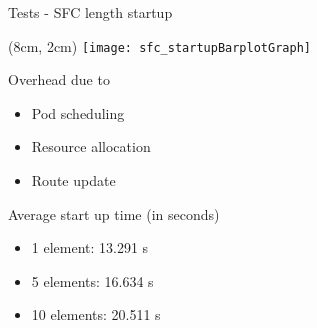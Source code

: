 \begin{frame}{Tests - SFC length startup}

  \begin{textblock*}{5cm}(8cm, 2cm)
    \texttt{[image: sfc\_startupBarplotGraph]}
  \end{textblock*}

  \vspace*{1cm}

  Overhead due to
  \begin{itemize}
  \item Pod scheduling
  \item Resource allocation
  \item Route update
  \end{itemize}

  \vspace*{1cm}

  Average start up time (in seconds)
  \begin{multicols}{2}
    \begin{itemize}
    \item 1 element: 13.291 s
    \item 5 elements: 16.634 s
    \item 10 elements: 20.511 s
    \end{itemize}
  \end{multicols}

  \vfill
\end{frame}
